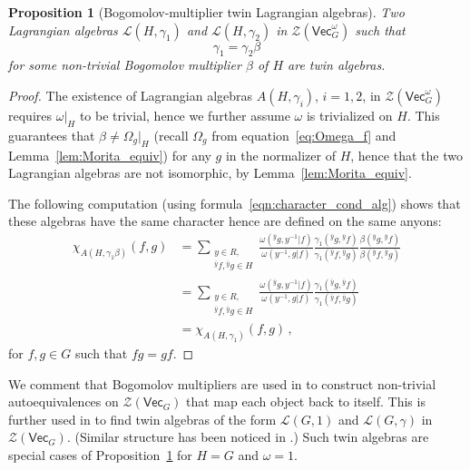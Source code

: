 \documentclass[aps,twocolumn,prx,floatfix,preprintnumbers, nofootinbib,10pt]{revtex4-2}
\numberwithin{equation}{section}
\newtheorem{proposition}[theorem]{Proposition}
\theoremstyle{definition}
\newcommand{\nn}{\nonumber}
\newcommand{\cL}{\mathcal{L}}
\newcommand{\cZ}{\mathcal{Z}}
\renewcommand{\Vec}{\mathsf{Vec}}
\begin{document}
\begin{proposition}[Bogomolov-multiplier twin Lagrangian algebras]
\label{prop:Bogomolovtwins}
    Two Lagrangian algebras $\cL(H,\gamma_1)$ and $\cL(H,\gamma_2)$ in $\cZ(\Vec_{G}^{\omega})$ such that 
    \begin{equation}
        \gamma_1=\gamma_2\beta
    \end{equation}
    for some non-trivial Bogomolov multiplier $\beta$ of $H$ are twin algebras.
\end{proposition}
\begin{proof}
    The existence of Lagrangian algebras $A(H,\gamma_i)$, $i=1,2$, in $\cZ(\Vec_G^\omega)$ requires $\omega|_H$ to be trivial, hence we further assume $\omega$ is trivialized on $H$. This guarantees that $\beta\neq \Omega_g|_H$ (recall $\Omega_g$ from equation~\eqref{eq:Omega_f} and Lemma~\ref{lem:Morita_equiv}) for any $g$ in the normalizer of $H$, hence that the two Lagrangian algebras are not isomorphic, by Lemma~\ref{lem:Morita_equiv}.

    The following computation (using formula~\eqref{eqn:character_cond_alg}) shows that these algebras have the same character hence are defined on the same anyons: 
    \begin{align}
        \chi_{A(H,\gamma_1\beta)}(f,g) & = \!\! \sum_{\substack{y\in R,\\ {}^{\bar{y}}f,{}^{\bar{y}}g\in H}} \!\! \frac{\omega({}^{\bar{y}}g, y^{-1} | f)}{\omega(y^{-1}, g|f)} \frac{\gamma_1({}^{\bar{y}}g, {}^{\bar{y}}f)}{\gamma_1({}^{\bar{y}}f,{}^{\bar{y}}g)}\frac{\beta({}^{\bar{y}}g, {}^{\bar{y}}f)}{\beta({}^{\bar{y}}f,{}^{\bar{y}}g)}\nn\\
        & = \!\! \sum_{\substack{y\in R,\\ {}^{\bar{y}}f,{}^{\bar{y}}g\in H}} \!\! \frac{\omega({}^{\bar{y}}g, y^{-1} | f)}{\omega(y^{-1}, g|f)} \frac{\gamma_1({}^{\bar{y}}g, {}^{\bar{y}}f)}{\gamma_1({}^{\bar{y}}f,{}^{\bar{y}}g)}\nn\\
        & = \chi_{A(H,\gamma_1)}(f,g)\,, 
    \end{align}
    for $f,g\in G$ such that $fg=gf$. 
\end{proof}

We comment that Bogomolov multipliers are used in \cite{Davydov:2013xov} to construct non-trivial autoequivalences on $\cZ(\Vec_G)$ that map each object back to itself. This is further used in \cite{Kobayashi:2025pxs, Kobayashi:2025ykb} to find twin algebras of the form $\cL(G,1)$ and $\cL(G,\gamma)$ in $\cZ(\Vec_G)$. (Similar structure has been noticed in \cite{Pollmann:2012}.) Such twin algebras are special cases of Proposition~\ref{prop:Bogomolovtwins} for $H=G$ and $\omega=1$.
\end{document}
